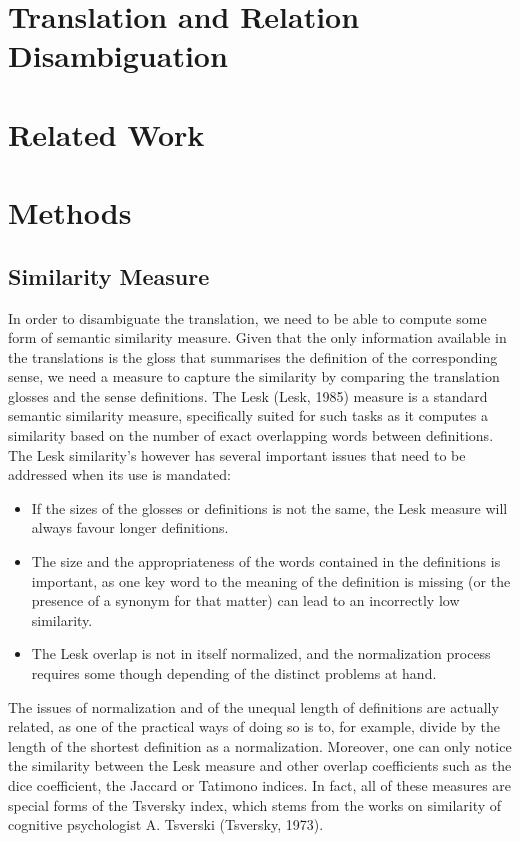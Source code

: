\documentclass[10pt, a4paper]{article}
\begin{document}
\section{Translation and Relation Disambiguation}


\section{Related Work}


\section{Methods}
\subsection{Similarity Measure}
In order to disambiguate the translation, we need to be able to compute some form of semantic similarity measure. Given that the only information available in the translations is the gloss that summarises the definition of the corresponding sense, we need a measure to capture the similarity by comparing the translation glosses and the sense definitions. The Lesk (Lesk, 1985) measure is a standard semantic similarity measure, specifically suited for such tasks as it computes a similarity based on the number of exact overlapping words between definitions. The Lesk similarity's however has several important issues that need to be addressed when its use is mandated: 
\begin{itemize}
	\item If the sizes of the glosses or definitions is not the same, the Lesk measure will always favour longer definitions.
	\item The size and the appropriateness of the words contained in the definitions is important, as one key word to the meaning of the definition is missing (or the presence of a synonym for that matter) can lead to an incorrectly low similarity.
	\item The Lesk overlap is not in itself normalized, and the normalization process requires some though depending of the distinct problems at hand.
\end{itemize}
 
 The issues of normalization and of the unequal length of definitions are actually related, as one of the practical ways of doing so is to, for example, divide by the length of the shortest definition as a normalization. Moreover, one can only notice the similarity between the Lesk measure and other overlap coefficients such as the dice coefficient, the Jaccard or Tatimono indices. In fact, all of these measures are special forms of the Tsversky index, which stems from the works on similarity of cognitive psychologist A. Tsverski (Tsversky, 1973).
\end{document}
